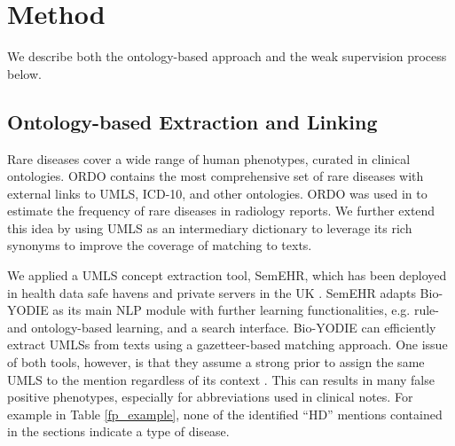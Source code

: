 \documentclass[letterpaper, 10 pt, conference]{ieeeconf}
\begin{document}
\section{Method}
We describe both the ontology-based approach and the weak supervision process below.

\subsection{Ontology-based Extraction and Linking}
Rare diseases cover a wide range of human phenotypes, curated in clinical ontologies. ORDO \cite{weinreich2008orphanet} contains the most comprehensive set of rare diseases with external links to UMLS, ICD-10, and other ontologies. ORDO was used in \cite{kahn2017ontology} to estimate the frequency of rare diseases in radiology reports. We further extend this idea by using UMLS as an intermediary dictionary to leverage its rich synonyms to improve the coverage of matching to texts.

We applied a UMLS concept extraction tool, SemEHR, which has been deployed in health data safe havens and private servers in the UK \cite{Wu2018semehr}. SemEHR adapts Bio-YODIE \cite{gorrell2018} as its main NLP module with further learning functionalities, e.g. rule- and ontology-based learning, and a search interface. Bio-YODIE can efficiently extract UMLSs from texts using a gazetteer-based matching approach. One issue of both tools, however, is that they assume a strong prior to assign the same UMLS to the mention regardless of its context \cite{gorrell2018}. This can results in many false positive phenotypes, especially for abbreviations used in clinical notes. For example in Table \ref{fp_example}, none of the identified ``HD'' mentions contained in the sections indicate a type of disease.
\end{document}
